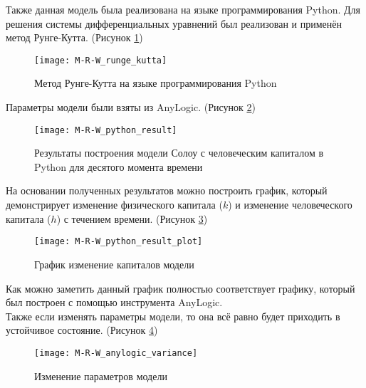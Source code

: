 Также данная модель была реализована на языке программирования Python. Для решения системы дифференциальных уравнений был реализован и применён метод Рунге-Кутта. (Рисунок \ref{fig:M-R-W_runge_kutta})
\begin{figure}[h]
	\centering \texttt{[image: M-R-W\_runge\_kutta]}
	\caption{Метод Рунге-Кутта на языке программирования Python}
	\label{fig:M-R-W_runge_kutta}
\end{figure}

Параметры модели были взяты из AnyLogic. (Рисунок \ref{fig:M-R-W_python_result})
\begin{figure}[h]
	\centering \texttt{[image: M-R-W\_python\_result]}
	\caption{Результаты построения модели Солоу с человеческим капиталом в Python для десятого момента времени}
	\label{fig:M-R-W_python_result}
\end{figure}

\newpage

На основании полученных результатов можно построить график, который демонстрирует изменение физического капитала ($k$) и изменение человеческого капитала ($h$) с течением времени. (Рисунок \ref{fig:M-R-W_python_result_plot})
\begin{figure}[h]
	\centering \texttt{[image: M-R-W\_python\_result\_plot]}
	\caption{График изменение капиталов модели}
	\label{fig:M-R-W_python_result_plot}
\end{figure}

Как можно заметить данный график полностью соответствует графику, который был построен с помощью инструмента AnyLogic.\\

Также если изменять параметры модели, то она всё равно будет приходить в устойчивое состояние. (Рисунок \ref{fig:M-R-W_anylogic_variance})
\begin{figure}[h]
	\centering \texttt{[image: M-R-W\_anylogic\_variance]}
	\caption{Изменение параметров модели}
	\label{fig:M-R-W_anylogic_variance}
\end{figure}